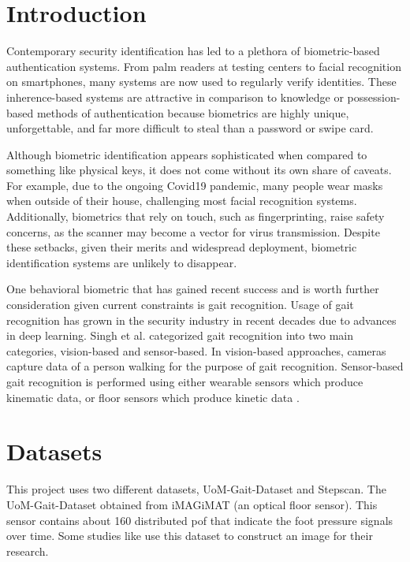 \section{Introduction}

Contemporary security identification has led to a plethora of biometric-based authentication systems. From palm readers at testing centers to facial recognition on smartphones, many systems are now used to regularly verify identities. These inherence-based systems are attractive in comparison to knowledge or possession-based methods of authentication because biometrics are highly unique, unforgettable, and far more difficult to steal than a password or swipe card.

Although biometric identification appears sophisticated when compared to something like physical keys, it does not come without its own share of caveats. For example, due to the ongoing Covid19 pandemic, many people wear masks when outside of their house, challenging most facial recognition systems. Additionally, biometrics that rely on touch, such as fingerprinting, raise safety concerns, as the scanner may become a vector for virus transmission. Despite these setbacks, given their merits and widespread deployment, biometric identification systems are unlikely to disappear.

One behavioral biometric that has gained recent success and is worth further consideration given current constraints is gait recognition. Usage of gait recognition has grown in the security industry in recent decades due to advances in deep learning. Singh et al. \cite{Singh2019APerspectives} categorized gait recognition into two main categories, vision-based and sensor-based. In vision-based approaches, cameras capture data of a person walking for the purpose of gait recognition. Sensor-based gait recognition is performed using either wearable sensors which produce kinematic data, or floor sensors which produce kinetic data \cite{Connor2018BiometricFeatures}.


\section{Datasets}
This project uses two different datasets, UoM-Gait-Dataset and Stepscan. The UoM-Gait-Dataset obtained from iMAGiMAT \cite{Cantoral-Ceballos2015IntelligentEnvironments} (an optical floor sensor). This sensor contains about 160 distributed \gls{pof} that indicate the foot pressure signals over time. Some studies like \cite{Costilla-Reyes2020DeepHealthcare} use this dataset to construct an image for their research.

